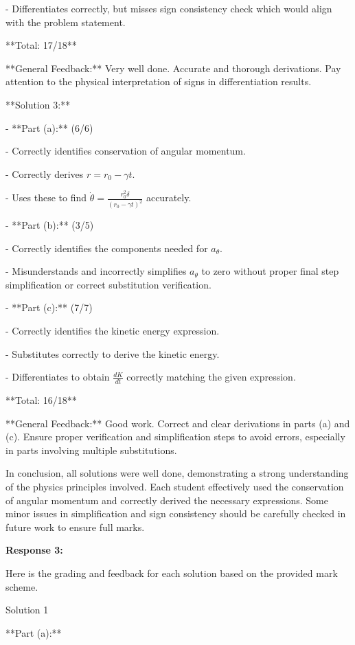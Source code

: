 \documentclass[a4paper,11pt]{article}
\begin{document}
  - Differentiates correctly, but misses sign consistency check which would align with the problem statement.

**Total: 17/18**

**General Feedback:** Very well done. Accurate and thorough derivations. Pay attention to the physical interpretation of signs in differentiation results.

**Solution 3:**

- **Part (a):** (6/6)

  - Correctly identifies conservation of angular momentum.
  
  - Correctly derives \(r = r_0 - \gamma t\).
  
  - Uses these to find \(\dot{\theta} = \frac{r_0^2 \delta}{(r_0 - \gamma t)^2}\) accurately.

- **Part (b):** (3/5)

  - Correctly identifies the components needed for \(a_{\theta}\).
  
  - Misunderstands and incorrectly simplifies \(a_{\theta}\) to zero without proper final step simplification or correct substitution verification.

- **Part (c):** (7/7)

  - Correctly identifies the kinetic energy expression.
  
  - Substitutes correctly to derive the kinetic energy.
  
  - Differentiates to obtain \(\frac{dK}{dt}\) correctly matching the given expression.

**Total: 16/18**

**General Feedback:** Good work. Correct and clear derivations in parts (a) and (c). Ensure proper verification and simplification steps to avoid errors, especially in parts involving multiple substitutions.

In conclusion, all solutions were well done, demonstrating a strong understanding of the physics principles involved. Each student effectively used the conservation of angular momentum and correctly derived the necessary expressions. Some minor issues in simplification and sign consistency should be carefully checked in future work to ensure full marks.

\bigskip
\textbf{Response 3:}

Here is the grading and feedback for each solution based on the provided mark scheme.

Solution 1

**Part (a):**
\end{document}
